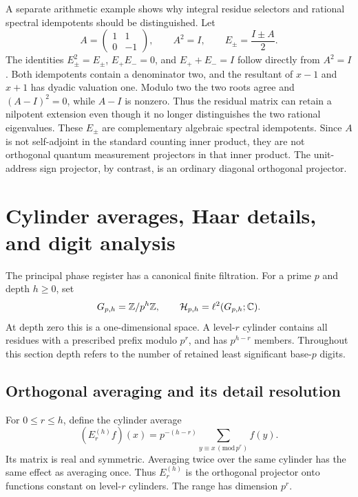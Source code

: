 A separate arithmetic example shows why integral residue selectors and
rational spectral idempotents should be distinguished. Let
\[
 A=\begin{pmatrix}1&1\\0&-1\end{pmatrix},\qquad A^2=I,
 \qquad E_\pm=\frac{I\pm A}{2}.
\]
The identities $E_\pm^2=E_\pm$, $E_+E_-=0$, and $E_++E_-=I$
follow directly from $A^2=I$. Both idempotents contain a denominator
two, and the resultant of $x-1$ and $x+1$ has dyadic valuation one.
Modulo two the two roots agree and $(A-I)^2=0$, while $A-I$ is
nonzero. Thus the residual matrix can retain a nilpotent extension even
though it no longer distinguishes the two rational eigenvalues.
These $E_\pm$ are complementary algebraic spectral idempotents. Since
$A$ is not self-adjoint in the standard counting inner product, they
are not orthogonal quantum measurement projectors in that inner product.
The unit-address sign projector, by contrast, is an ordinary diagonal
orthogonal projector.



\section{Cylinder averages, Haar details, and digit analysis}
\label{a-finite-haar}

The principal phase register has a canonical finite filtration. For a
prime $p$ and depth $h\geq0$, set
\[
 G_{p,h}=\mathbb Z/p^h\mathbb Z,\qquad\mathcal H_{p,h}=\ell^2(G_{p,h};\mathbb C).
\]
At depth zero this is a one-dimensional space. A level-$r$ cylinder
contains all residues with a prescribed prefix modulo $p^r$, and has
$p^{h-r}$ members. Throughout this section depth refers to the number of
retained least significant base-$p$ digits.

\subsection{Orthogonal averaging and its detail resolution}

For $0\leq r\leq h$, define the cylinder average
\begin{equation}
 (E_r^{(h)}f)(x)=p^{-(h-r)}
       \sum_{y\equiv x\, (\mathrm{mod}\,p^r)}f(y).
 \label{a-finite-cylinder-average}
\end{equation}
Its matrix is real and symmetric. Averaging twice over the same cylinder
has the same effect as averaging once. Thus $E_r^{(h)}$ is the
orthogonal projector onto functions constant on level-$r$ cylinders.
The range has dimension $p^r$.

